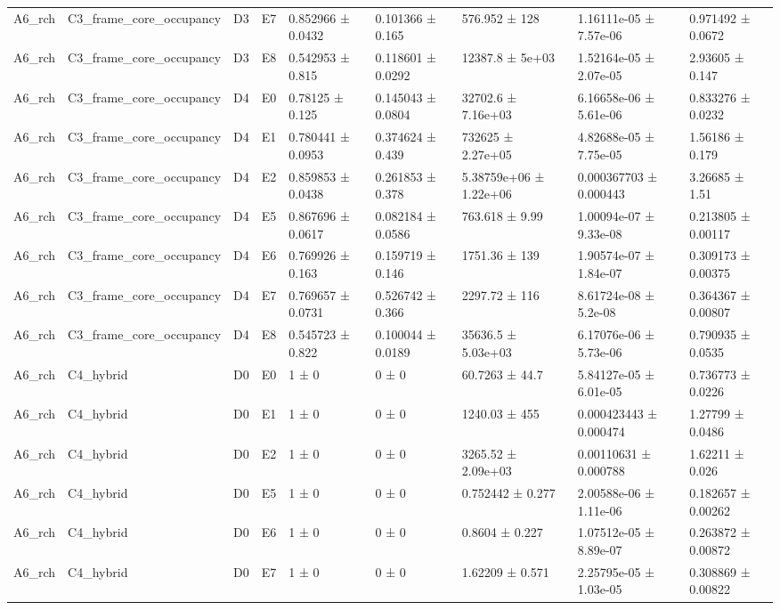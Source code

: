 \begin{table}
\begin{tabular}{lllllllll}
A6\_rch & C3\_frame\_core\_occupancy & D3 & E7 & 0.852966 ± 0.0432 & 0.101366 ± 0.165 & 576.952 ± 128 & 1.16111e-05 ± 7.57e-06 & 0.971492 ± 0.0672 \\
A6\_rch & C3\_frame\_core\_occupancy & D3 & E8 & 0.542953 ± 0.815 & 0.118601 ± 0.0292 & 12387.8 ± 5e+03 & 1.52164e-05 ± 2.07e-05 & 2.93605 ± 0.147 \\
A6\_rch & C3\_frame\_core\_occupancy & D4 & E0 & 0.78125 ± 0.125 & 0.145043 ± 0.0804 & 32702.6 ± 7.16e+03 & 6.16658e-06 ± 5.61e-06 & 0.833276 ± 0.0232 \\
A6\_rch & C3\_frame\_core\_occupancy & D4 & E1 & 0.780441 ± 0.0953 & 0.374624 ± 0.439 & 732625 ± 2.27e+05 & 4.82688e-05 ± 7.75e-05 & 1.56186 ± 0.179 \\
A6\_rch & C3\_frame\_core\_occupancy & D4 & E2 & 0.859853 ± 0.0438 & 0.261853 ± 0.378 & 5.38759e+06 ± 1.22e+06 & 0.000367703 ± 0.000443 & 3.26685 ± 1.51 \\
A6\_rch & C3\_frame\_core\_occupancy & D4 & E5 & 0.867696 ± 0.0617 & 0.082184 ± 0.0586 & 763.618 ± 9.99 & 1.00094e-07 ± 9.33e-08 & 0.213805 ± 0.00117 \\
A6\_rch & C3\_frame\_core\_occupancy & D4 & E6 & 0.769926 ± 0.163 & 0.159719 ± 0.146 & 1751.36 ± 139 & 1.90574e-07 ± 1.84e-07 & 0.309173 ± 0.00375 \\
A6\_rch & C3\_frame\_core\_occupancy & D4 & E7 & 0.769657 ± 0.0731 & 0.526742 ± 0.366 & 2297.72 ± 116 & 8.61724e-08 ± 5.2e-08 & 0.364367 ± 0.00807 \\
A6\_rch & C3\_frame\_core\_occupancy & D4 & E8 & 0.545723 ± 0.822 & 0.100044 ± 0.0189 & 35636.5 ± 5.03e+03 & 6.17076e-06 ± 5.73e-06 & 0.790935 ± 0.0535 \\
A6\_rch & C4\_hybrid & D0 & E0 & 1 ± 0 & 0 ± 0 & 60.7263 ± 44.7 & 5.84127e-05 ± 6.01e-05 & 0.736773 ± 0.0226 \\
A6\_rch & C4\_hybrid & D0 & E1 & 1 ± 0 & 0 ± 0 & 1240.03 ± 455 & 0.000423443 ± 0.000474 & 1.27799 ± 0.0486 \\
A6\_rch & C4\_hybrid & D0 & E2 & 1 ± 0 & 0 ± 0 & 3265.52 ± 2.09e+03 & 0.00110631 ± 0.000788 & 1.62211 ± 0.026 \\
A6\_rch & C4\_hybrid & D0 & E5 & 1 ± 0 & 0 ± 0 & 0.752442 ± 0.277 & 2.00588e-06 ± 1.11e-06 & 0.182657 ± 0.00262 \\
A6\_rch & C4\_hybrid & D0 & E6 & 1 ± 0 & 0 ± 0 & 0.8604 ± 0.227 & 1.07512e-05 ± 8.89e-07 & 0.263872 ± 0.00872 \\
A6\_rch & C4\_hybrid & D0 & E7 & 1 ± 0 & 0 ± 0 & 1.62209 ± 0.571 & 2.25795e-05 ± 1.03e-05 & 0.308869 ± 0.00822 \\

\end{tabular}
\end{table}
